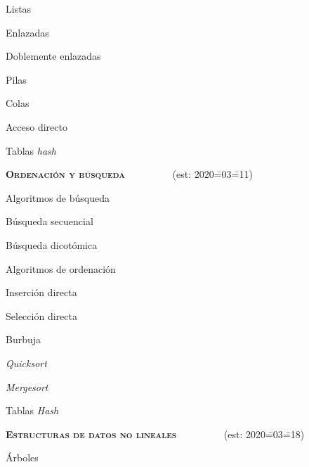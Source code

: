 \begin{longenum}
\begin{longenum}
        \begin{longenum}
            \item Listas
            \begin{longenum}
                \item Enlazadas
                \item Doblemente enlazadas
            \end{longenum}
            \item Pilas
            \item Colas
        \end{longenum}
        \item Acceso directo
        \begin{longenum}
            \item Tablas \textit{hash}
        \end{longenum}
    \end{longenum}
    \item \textbf{\textsc{Ordenación y búsqueda}} \ \ \ \ \ \ \ \ \ (est: 2020\==03\==11)
    \begin{longenum}
        \item Algoritmos de búsqueda
        \begin{longenum}
            \item Búsqueda secuencial
            \item Búsqueda dicotómica
        \end{longenum}
        \item Algoritmos de ordenación
        \begin{longenum}
            \item Inserción directa
            \item Selección directa
            \item Burbuja
            \item \textit{Quicksort}
            \item \textit{Mergesort}
        \end{longenum}
        \item Tablas \textit{Hash}
    \end{longenum}
    \item \textbf{\textsc{Estructuras de datos no lineales}} \ \ \ \ \ \ \ \ \ (est: 2020\==03\==18)
    \begin{longenum}
        \item Árboles
        \begin{longenum}

\end{longenum}
\end{longenum}
\end{longenum}
